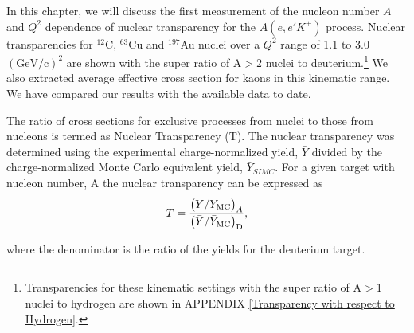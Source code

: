 %
In this chapter, we will discuss the first measurement of the nucleon number $A$ and $Q^2$ dependence of nuclear transparency for the $A(e,e'K^+)$ process. Nuclear transparencies for $^{12}$C, $^{63}$Cu and $^{197}$Au nuclei over a  $Q^2$ range of 1.1 $\mathrm{to}$ 3.0 $(\mathrm{GeV/c})^2$ are shown with the super ratio of A$>$2 nuclei to deuterium.\footnote{Transparencies for these kinematic settings with the super ratio of A$>$1 nuclei to hydrogen are shown in APPENDIX \ref{Transparency with respect to Hydrogen}.} We also extracted average effective cross section for kaons in this kinematic range. We have compared our results with the available data to date.


%
%
\label{Transparency}
The ratio of cross sections for exclusive processes from nuclei to those from nucleons is termed as Nuclear Transparency (T). The nuclear transparency was determined using the experimental charge-normalized yield, $\bar{Y}$ divided by the charge-normalized Monte Carlo equivalent yield, $\bar{Y}_{SIMC}$. For a given
target with nucleon number, A the nuclear transparency can be expressed as
\vspace{0.5in}
\begin{equation} \label{equ:nucltransp2}
T = 
\frac{\left(\bar Y/ \bar Y_{\rm MC} \right)_A}
{\left(\bar Y/ \bar Y_{\rm MC} \right)_{\rm D}},
\end{equation}

\noindent
where the denominator is the ratio of the yields for the deuterium target.



